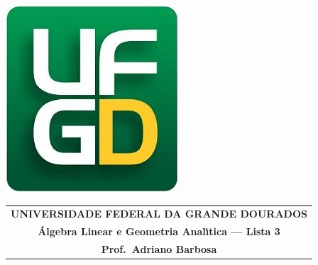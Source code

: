 \documentclass[a4paper,5pt]{amsbook}
\begin{document}
\thispagestyle{empty}
\begin{minipage}[h]{0.14\textwidth}
	\includegraphics[scale=0.24]{../../ufgd.png}
\end{minipage}
\begin{minipage}[h]{\textwidth}
\begin{tabular}{c}
{{\bf UNIVERSIDADE FEDERAL DA GRANDE DOURADOS}}\\
{{\bf \'{A}lgebra Linear e Geometria Anal\'{\i}tica --- Lista 3}}\\
{{\bf Prof.\ Adriano Barbosa}}\\
\end{tabular}
\vspace{-0.45cm}
%
\end{minipage}

\vspace{1cm}
\end{document}
